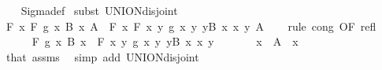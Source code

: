 \begin{isabellebody}
%
\isadelimproof
\ \ %
\endisadelimproof
%
\isatagproof
{}\isamarkupfalse%
\ Sigma{\isacharunderscore}{\kern0pt}def\isanewline
{}\isamarkupfalse%
\ {\isacharparenleft}{\kern0pt}subst\ UNION{\isacharunderscore}{\kern0pt}disjoint{\isacharparenright}{\kern0pt}\isanewline
\ \ \isamarkupfalse%
\ {\isachardoublequoteopen}F\ {\isacharparenleft}{\kern0pt}{\isasymlambda}x{\isachardot}{\kern0pt}\ F\ {\isacharparenleft}{\kern0pt}g\ x{\isacharparenright}{\kern0pt}\ {\isacharparenleft}{\kern0pt}B\ x{\isacharparenright}{\kern0pt}{\isacharparenright}{\kern0pt}\ A\ {\isacharequal}{\kern0pt}\ F\ {\isacharparenleft}{\kern0pt}{\isasymlambda}x{\isachardot}{\kern0pt}\ F\ {\isacharparenleft}{\kern0pt}{\isasymlambda}{\isacharparenleft}{\kern0pt}x{\isacharcomma}{\kern0pt}\ y{\isacharparenright}{\kern0pt}{\isachardot}{\kern0pt}\ g\ x\ y{\isacharparenright}{\kern0pt}\ {\isacharparenleft}{\kern0pt}{\isasymUnion}y{\isasymin}B\ x{\isachardot}{\kern0pt}\ {\isacharbraceleft}{\kern0pt}{\isacharparenleft}{\kern0pt}x{\isacharcomma}{\kern0pt}\ y{\isacharparenright}{\kern0pt}{\isacharbraceright}{\kern0pt}{\isacharparenright}{\kern0pt}{\isacharparenright}{\kern0pt}\ A{\isachardoublequoteclose}\isanewline
\ \ \isamarkupfalse%
\ {\isacharparenleft}{\kern0pt}rule\ cong\ {\isacharbrackleft}{\kern0pt}OF\ refl{\isacharbrackright}{\kern0pt}{\isacharparenright}{\kern0pt}\isanewline
\ \ \ \ \isamarkupfalse%
\ {\isachardoublequoteopen}F\ {\isacharparenleft}{\kern0pt}g\ x{\isacharparenright}{\kern0pt}\ {\isacharparenleft}{\kern0pt}B\ x{\isacharparenright}{\kern0pt}\ {\isacharequal}{\kern0pt}\ F\ {\isacharparenleft}{\kern0pt}{\isasymlambda}{\isacharparenleft}{\kern0pt}x{\isacharcomma}{\kern0pt}\ y{\isacharparenright}{\kern0pt}{\isachardot}{\kern0pt}\ g\ x\ y{\isacharparenright}{\kern0pt}\ {\isacharparenleft}{\kern0pt}{\isasymUnion}y{\isasymin}B\ x{\isachardot}{\kern0pt}\ {\isacharbraceleft}{\kern0pt}{\isacharparenleft}{\kern0pt}x{\isacharcomma}{\kern0pt}\ y{\isacharparenright}{\kern0pt}{\isacharbraceright}{\kern0pt}{\isacharparenright}{\kern0pt}{\isachardoublequoteclose}\isanewline
\ \ \ \ \ \ \ {\isachardoublequoteopen}x\ {\isasymin}\ A{\isachardoublequoteclose}\ \ x\isanewline
\ \ \ \ \ \ \isamarkupfalse%
\ that\ assms\ \isamarkupfalse%
\ {\isacharparenleft}{\kern0pt}simp\ add{\isacharcolon}{\kern0pt}\ UNION{\isacharunderscore}{\kern0pt}disjoint{\isacharparenright}{\kern0pt}\isanewline
\ \ \isamarkupfalse%
\isanewline
{}\isamarkupfalse%

\end{isabellebody}
